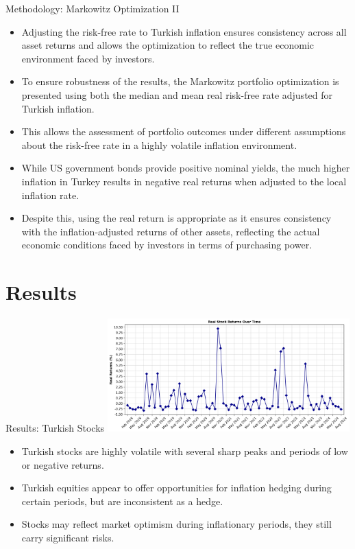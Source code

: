 \documentclass{beamer}
\begin{document}
\begin{frame}{Methodology: Markowitz Optimization II}
\begin{itemize}
    \item Adjusting the risk-free rate to Turkish inflation ensures consistency across all asset returns and allows the optimization to reflect the true economic environment faced by investors.
    \item To ensure robustness of the results, the Markowitz portfolio optimization is presented using both the median and mean real risk-free rate adjusted for Turkish inflation.
    \item This allows the assessment of portfolio outcomes under different assumptions about the risk-free rate in a highly volatile inflation environment.
    \item While US government bonds provide positive nominal yields, the much higher inflation in Turkey results in negative real returns when adjusted to the local inflation rate.
    \item Despite this, using the real return is appropriate as it ensures consistency with the inflation-adjusted returns of other assets, reflecting the actual economic conditions faced by investors in terms of purchasing power. 
\end{itemize}
\end{frame}


\section{Results}
\begin{frame}{Results: Turkish Stocks}
\includegraphics[width=0.7\textwidth]{real_stock_returns.png}
\begin{itemize}
\item Turkish stocks are highly volatile with several sharp peaks and periods of low or negative returns.
\item Turkish equities appear to offer opportunities for inflation hedging during certain periods, but are inconsistent as a hedge.
\item Stocks may reflect market optimism during inflationary periods, they still carry significant risks.
\end{itemize}
\end{frame}
\end{document}
